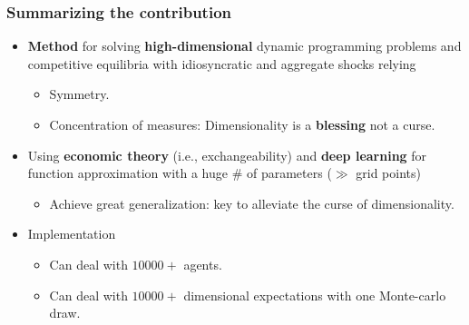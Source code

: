 \documentclass[aspectratio=169,10pt]{beamer}
\newcommand{\emphcolor}[1]{\textbf{\textcolor{emphcolorval}{#1}}}
\begin{document}
\begin{frame}
	\frametitle{Summarizing the contribution}
	\begin{itemize}
		
		\item \emphcolor{Method} for solving \emphcolor{high-dimensional} dynamic programming problems and competitive equilibria with idiosyncratic and aggregate shocks relying\vspace{0.1in}
		\begin{itemize}
			\item Symmetry. \vspace{0.1in}
			\item Concentration of measures: Dimensionality is a \emphcolor{blessing} not a curse.\vspace{0.1in}
		\end{itemize}
		
		\item Using \emphcolor{economic theory} (i.e., exchangeability) and \emphcolor{deep learning} for function approximation with a huge \# of parameters ($\gg$ grid points)\vspace{0.1in}
		\begin{itemize}
			\item Achieve great generalization: key to alleviate the curse of dimensionality.\vspace{0.1in}
		\end{itemize}
		
		\item Implementation\vspace{0.1in}
		\begin{itemize}
			\item Can deal with $10000+$ agents.\vspace{0.1in}
			\smallskip
			\item Can deal with $10000+$ dimensional expectations with one Monte-carlo draw.\vspace{0.1in}
			\smallskip
		\end{itemize}
	\end{itemize}
\end{frame}
\end{document}
